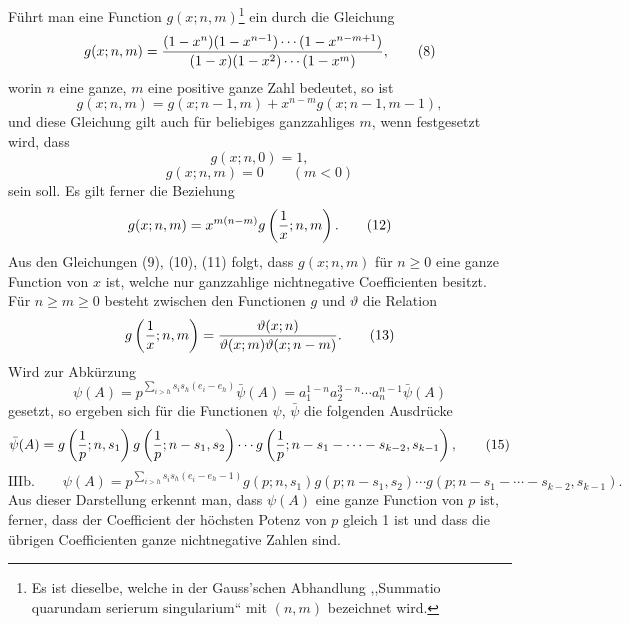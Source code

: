 \documentclass[11pt,a4paper]{article}
\newcommand{\tht}{\vartheta}
\begin{document}
Führt man eine Function $g(x;n,m)$\footnote{Es ist dieselbe, welche in der Gauss'schen Abhandlung ,,Summatio quarundam serierum singularium`` mit $(n,m)$ bezeichnet wird.} ein durch die Gleichung
\begin{equation}
 g(x;n,m)=
 { (1-x^n)(1-x^{n-1})\cdots(1-x^{n-m+1})
 \over
 (1-x)(1-x^2)\cdots(1-x^m) },
\tag{8}
\end{equation}
worin $n$ eine ganze, $m$ eine positive ganze Zahl bedeutet, so ist
\begin{equation}
 g(x;n,m)=g(x;n-1,m)+x^{n-m}g(x;n-1,m-1),
\tag{9}
\end{equation}
und diese Gleichung gilt auch für beliebiges ganzzahliges $m$, wenn festgesetzt wird, dass
\begin{equation}
 g(x;n,0)=1,
\tag{10}
\end{equation}
\begin{equation}
 g(x;n,m)=0\qquad (m<0)
\tag{11}
\end{equation}
sein soll. Es gilt ferner die Beziehung
\begin{equation}
 g(x;n,m)=x^{m(n-m)}g\left({1\over x};n,m\right).
\tag{12}
\end{equation}
Aus den Gleichungen (9), (10), (11) folgt, dass $g(x;n,m)$ für $n\ge0$ eine ganze Function von $x$ ist, welche nur ganzzahlige nichtnegative Coefficienten besitzt. Für $n\ge m\ge0$ besteht zwischen den Functionen $g$ und $\tht$ die Relation
\begin{equation}
 g\left({1\over x};n,m\right)={\tht(x;n)\over\tht(x;m)\tht(x;n-m)}.
\tag{13}
\end{equation}
Wird zur Abkürzung
\begin{equation}
 \psi(A)=p^{\sum_{i>h}s_i s_h(e_i-e_h)}\bar\psi(A)
 =a_1^{1-n}a_2^{3-n}\cdots a_n^{n-1}\bar\psi(A)
\tag{14}
\end{equation}
gesetzt, so ergeben sich für die Functionen $\psi$, $\bar\psi$ die folgenden Ausdrücke
\begin{equation}
 \bar\psi(A)=
 g\left({1\over p};n,s_1\right)
 g\left({1\over p};n-s_1,s_2\right)
 \cdots
 g\left({1\over p};n-s_1-\cdots-s_{k-2},s_{k-1}\right),
\tag{15}
\end{equation}
\begin{equation}
\text{IIIb.}\qquad
 \psi(A)=p^{\sum_{i>h}s_i s_h(e_i-e_h-1)}
 g(p;n,s_1)g(p;n-s_1,s_2)\cdots
 g(p;n-s_1-\cdots-s_{k-2},s_{k-1}).
\tag{16}
\end{equation}
Aus dieser Darstellung erkennt man, dass $\psi(A)$ eine ganze Function von $p$ ist, ferner, dass der Coefficient der höchsten Potenz von $p$ gleich 1 ist und dass die übrigen Coefficienten ganze nichtnegative Zahlen sind.
\end{document}
